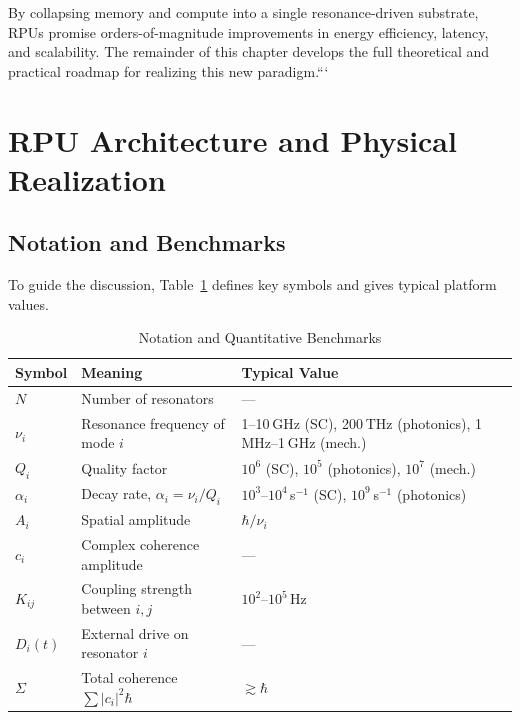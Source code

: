 By collapsing memory and compute into a single resonance-driven substrate, RPUs promise orders-of-magnitude improvements in energy efficiency, latency, and scalability.  The remainder of this chapter develops the full theoretical and practical roadmap for realizing this new paradigm.```

\section{RPU Architecture and Physical Realization}

\subsection{Notation and Benchmarks}
To guide the discussion, Table~\ref{tab:rpu_notation} defines key symbols and gives typical platform values.

\begin{table}[ht]
  \centering
  \caption{Notation and Quantitative Benchmarks}
  \label{tab:rpu_notation}
  \begin{tabular}{@{}lll@{}}
    \toprule
    Symbol & Meaning & Typical Value \\
    \midrule
    \(N\)          & Number of resonators                     & — \\
    \(\nu_i\)      & Resonance frequency of mode \(i\)        & 1–10 GHz (SC), 200 THz (photonics), 1 MHz–1 GHz (mech.) \\
    \(Q_i\)        & Quality factor                           & \(10^6\) (SC), \(10^5\) (photonics), \(10^7\) (mech.) \\
    \(\alpha_i\)   & Decay rate, \(\alpha_i = \nu_i/Q_i\)      & \(10^3\)–\(10^4\)\,s\(^{-1}\) (SC), \(10^9\) s\(^{-1}\) (photonics) \\
    \(A_i\)        & Spatial amplitude                        & \(\hbar/\nu_i\) \\
    \(c_i\)        & Complex coherence amplitude              & — \\
    \(K_{ij}\)     & Coupling strength between \(i,j\)        & \(10^2\)–\(10^5\)\,Hz \\
    \(D_i(t)\)     & External drive on resonator \(i\)        & — \\
    \(\Sigma\)     & Total coherence \(\sum|c_i|^2\hbar\)     & \(\gtrsim\hbar\) \\
    \bottomrule
  \end{tabular}
\end{table}

